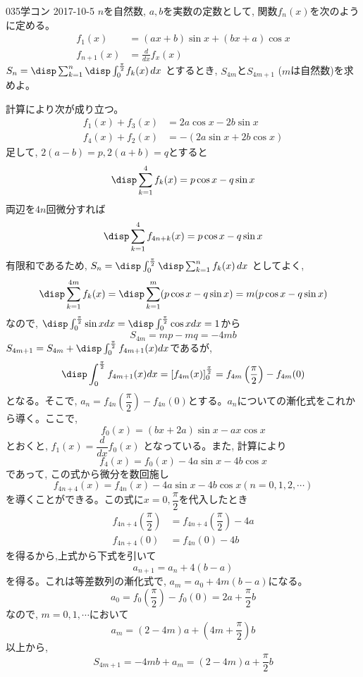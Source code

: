 \begin{prob}{035}{}{学コン 2017-10-5}
 $n$を自然数, $a,b$を実数の定数として, 関数$f_n(x)$を次のように定める。
 \begin{align*}
  f_1(x)&=(ax+b)\sin{x}+(bx+a)\cos{x} \\
  f_{n+1}(x)&=\frac{d}{dx}f_x(x)
 \end{align*}
 $S_n=\disp\sum_{k=1}^n\disp\int_0^{\frac{\pi}{2}}\! f_k(x)\, dx$ とするとき, $S_{4m}$と$S_{4m+1}$ ($m$は自然数)を求めよ。
\end{prob}
計算により次が成り立つ。
\begin{align*}
 f_1(x)+f_3(x)&=2a\cos{x}-2b\sin{x} \\
 f_4(x)+f_2(x)&=-(2a\sin{x}+2b\cos{x}) 
\end{align*}
足して, $2(a-b)=p, 2(a+b)=q$とすると
\[\disp\sum_{k=1}^4f_k(x) = p\cos{x}-q\sin{x}\]
両辺を$4n$回微分すれば
\[\disp\sum_{k=1}^4f_{4n+k}(x) = p\cos{x}-q\sin{x}\]
有限和であるため, $S_n =\disp\int_0^{\frac{\pi}{2}} \disp\sum_{k=1}^nf_k(x)\, dx$ としてよく,
\[\disp\sum_{k=1}^{4m}f_k(x) = \disp\sum_{k=1}^{m}(p\cos{x}-q\sin{x})=m(p\cos{x}-q\sin{x})\]
なので, $\disp\int_0^{\frac{\pi}{2}}\sin{x}dx=\disp\int_0^{\frac{\pi}{2}}\cos{x}dx=1$から
\[S_{4m}=mp-mq=-4mb\]
$S_{4m+1}=S_{4m}+\disp\int_{0}^{\frac{\pi}{2}}f_{4m+1}(x)dx$であるが,
\[\disp\int_{0}^{\frac{\pi}{2}}f_{4m+1}(x)dx=\left[ f_{4m}(x)\right]^{\frac{\pi}{2}}_0 = f_{4m}\left(\dfrac{\pi}{2}\right)-f_{4m}(0)\]
となる。そこで, $a_n=f_{4n}\left( \dfrac{\pi}{2}\right)-f_{4n}(0)$とする。$a_n$についての漸化式をこれから導く。ここで, 
\[f_0(x)=(bx+2a)\sin{x}-ax\cos{x}\]
とおくと, $f_1(x)=\dfrac{d}{dx}f_0(x)$ となっている。また, 計算により
\[f_4(x)=f_0(x)-4a\sin{x}-4b\cos{x}\]
であって, この式から微分を数回施し
\[f_{4n+4}(x)=f_{4n}(x) -4a\sin{x}-4b\cos{x}　(n=0,1,2,\cdots )\]
を導くことができる。この式に$x=0,\dfrac{\pi}{2}$を代入したとき
\begin{align*}
 f_{4n+4}\left(\dfrac{\pi}{2}\right)&=f_{4n+4}\left( \dfrac{\pi}{2}\right)-4a \\
 f_{4n+4}(0)&=f_{4n}(0)-4b
\end{align*}
を得るから,上式から下式を引いて
\[a_{n+1}=a_n+4(b-a)\]
を得る。これは等差数列の漸化式で, $a_m=a_0+4m(b-a)$になる。
\[a_0=f_0\left(\dfrac{\pi}{2}\right)-f_0(0)=2a+\dfrac{\pi}{2}b\]
なので, $m=0,1,\cdots $において
\[a_m=(2-4m)a+\left(4m+\dfrac{\pi}{2}\right)b\]
以上から, 
\[S_{4m+1}=-4mb+a_m=(2-4m)a+\dfrac{\pi}{2}b\]
